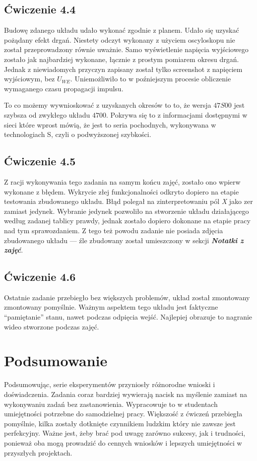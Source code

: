 \documentclass{article}
\begin{document}
    \subsection{Ćwiczenie 4.4}
      Budowę zdanego układu udało wykonać zgodnie z planem. Udało się uzyskać pożądany efekt drgań. Niestety odczyt wykonany z użyciem oscyloskopu nie został przeprowadzony równie uważnie. Samo wyświetlenie napięcia wyjściowego zostało jak najbardziej wykonane, łącznie z prostym pomiarem okresu drgań. Jednak z niewiadomych przyczyn zapisany został tylko screenshot z napięciem wyjściowym, bez $U_{WE}$. Uniemożliwiło to w poźniejszym procesie obliczenie wymaganego czasu propagacji impulsu.

      To co możemy wywnioskować z uzyskanych okresów to to, że wersja $47S00$ jest szybsza od zwykłego układu $4700$. Pokrywa się to z informacjami dostępnymi w sieci które wprost mówią, że jest to seria pochodnych, wykonywana w technologiach S, czyli o podwyższonej szybkości.
    \subsection{Ćwiczenie 4.5}
      Z racji wykonywania tego zadania na samym końcu zajęć, zostało ono wpierw wykonane z błędem. Wykrycie złej funkcjonalności odkryto dopiero na etapie testowania zbudowanego układu. Błąd polegał na zinterpretowaniu pól \textit{X} jako zer zamiast jedynek. Wybranie jedynek pozwoliło na stworzenie układu działającego według zadanej tablicy prawdy, jednak zostało dopiero dokonane na etapie pracy nad tym sprawozdaniem. Z tego też powodu zadanie nie posiada zdjęcia zbudowanego układu --- źle zbudowany został umieszczony w sekcji \textit{\textbf{Notatki z zajęć}}.

    \subsection{Ćwiczenie 4.6}
      Ostatnie zadanie przebiegło bez większych problemów, układ został zmontowany zmontowany pomyślnie. Ważnym aspektem tego układu jest faktyczne ``pamiętanie'' stanu, nawet podczas odpięcia wejść. Najlepiej obrazuje to nagranie wideo stworzone podczas zajęć.
  \section{Podsumowanie}
    Podsumowując, serie eksperymentów przyniosły różnorodne wnioski i doświadczenia. Zadania coraz bardziej wywierają nacisk na myślenie zamiast na wykonywaniu zadań bez zastanowienia. Wypracowuje to w studentach umiejętności potrzebne do samodzielnej pracy. Większość z ćwiczeń przebiegła pomyślnie, kilka zostały dotknięte czynnikiem ludzkim który nie zawsze jest perfekcyjny. Ważne jest, żeby brać pod uwagę zarówno sukcesy, jak i trudności, ponieważ oba mogą prowadzić do cennych wniosków i lepszych umiejętności w przyszłych projektach.
\end{document}
